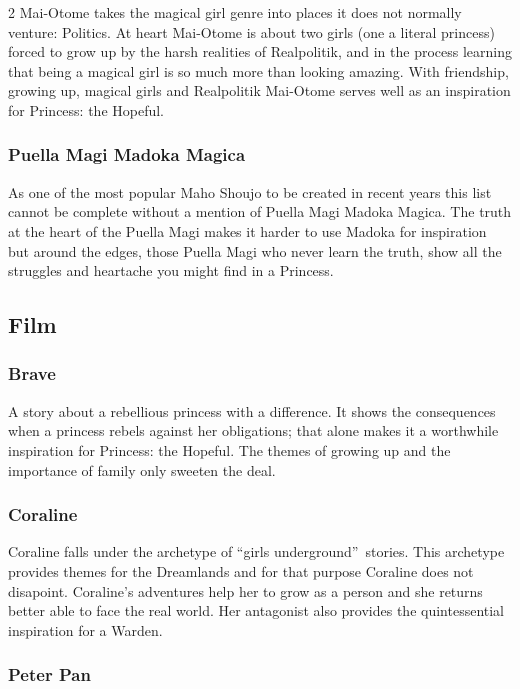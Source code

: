 \begin{multicols}{2}
Mai-Otome takes the magical girl genre into places it does not normally venture: Politics. At heart Mai-Otome is about two girls (one a literal princess) forced to grow up by the harsh realities of Realpolitik, and in the process learning that being a magical girl is so much more than looking amazing. With friendship, growing up, magical girls and Realpolitik Mai-Otome serves well as an inspiration for Princess: the Hopeful. 

\subsubsection*{Puella Magi Madoka Magica}

As one of the most popular Maho Shoujo to be created in recent years this list cannot be complete without a mention of Puella Magi Madoka Magica. The truth at the heart of the Puella Magi makes it harder to use Madoka for inspiration but around the edges, those Puella Magi who never learn the truth, show all the struggles and heartache you might find in a Princess. 

\subsection*{Film}

\subsubsection*{Brave} 

A story about a rebellious princess with a difference. It shows the consequences when a princess rebels against her obligations; that alone makes it a worthwhile inspiration for Princess: the Hopeful. The themes of growing up and the importance of family only sweeten the deal. 

\subsubsection*{Coraline}

Coraline falls under the archetype of \textquotedblleft girls underground\textquotedblright\, stories. This archetype provides themes for the Dreamlands and for that purpose Coraline does not disapoint. Coraline's adventures help her to grow as a person and she returns better able to face the real world. Her antagonist also provides the quintessential inspiration for a Warden. 

\subsubsection*{Peter Pan}


\end{multicols}
